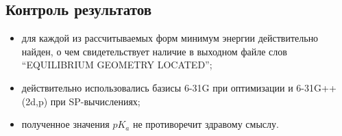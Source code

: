 \subsection{Контроль результатов}
\begin{itemize}
    \item для каждой из рассчитываемых форм минимум энергии действительно найден, о чем свидетельствует наличие в выходном файле слов “EQUILIBRIUM GEOMETRY LOCATED”;
    \item действительно использовались базисы 6-31G при оптимизации и 6-31G++(2d,p) при SP-вычислениях;
    \item полученное значения $pK_a$ не противоречит здравому смыслу.
\end{itemize}
